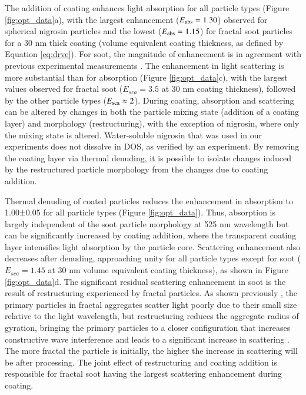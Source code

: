 The addition of coating enhances light absorption for all particle types (Figure \ref{fig:opt_data}a), with the largest enhancement ($E_{\rm abs}=1.30$) observed for spherical nigrosin particles and the lowest ($E_{\rm abs}=1.15$) for fractal soot particles for a 30 nm thick coating (volume equivalent coating thickness, as defined by Equation \ref{eq:drve}). For soot, the magnitude of enhancement is in agreement with previous experimental measurements \citep{RN41,RN7}. The enhancement in light scattering is more substantial than for absorption (Figure \ref{fig:opt_data}c), with the largest values observed for fractal soot ($E_{sca} = 3.5$ at 30 nm coating thickness), followed by the other particle types ($E_{\rm sca} \approx 2$). During coating, absorption and scattering can be altered by changes in both the particle mixing state (addition of a coating layer) and morphology (restructuring), with the exception of nigrosin, where only the mixing state is altered. Water-soluble nigrosin that was used in our experiments does not dissolve in DOS, as verified by an experiment. By removing the coating layer via thermal denuding, it is possible to isolate changes induced by the restructured particle morphology from the changes due to coating addition.

Thermal denuding of coated particles reduces the enhancement in absorption to 1.00±0.05 for all particle types (Figure \ref{fig:opt_data}). Thus, absorption is largely independent of the soot particle morphology at 525 nm wavelength \citep{radney2014dependence} but can be significantly increased by coating addition, where the transparent coating layer intensifies light absorption by the particle core.
Scattering enhancement also decreases after denuding, approaching unity for all particle types except for soot ($E_{sca} = 1.45$ at 30 nm volume equivalent coating thickness), as shown in Figure \ref{fig:opt_data}d. The significant residual scattering enhancement in soot is the result of restructuring experienced by fractal particles. As shown previously \citep{RN40}, the primary particles in fractal aggregates scatter light poorly due to their small size relative to the light wavelength, but restructuring reduces the aggregate radius of gyration, bringing the primary particles to a closer configuration that increases constructive wave interference and leads to a significant increase in scattering \citep{RN7}. The more fractal the particle is initially, the higher the increase in scattering will be after processing. The joint effect of restructuring and coating addition is responsible for fractal soot having the largest scattering enhancement during coating.

